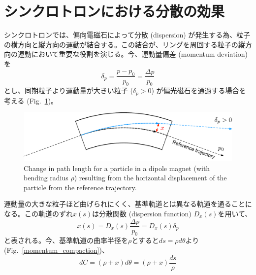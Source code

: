 \documentclass[10pt,a4paper]{ltjsarticle}
\begin{document}
\section{シンクロトロンにおける分散の効果}
シンクロトロンでは、偏向電磁石によって分散 (dispersion) が発生する為、粒子の横方向と縦方向の運動が結合する。この結合が、リングを周回する粒子の縦方向の運動において重要な役割を演じる。今、運動量偏差 (momentum deviation) を
%
\begin{equation}
  \delta_p = \frac{p-p_0}{p_0}=\frac{\Delta p}{p_0}
\end{equation}
%
とし、同期粒子より運動量が大きい粒子 ($\delta_p >0$) が偏光磁石を通過する場合を考える (Fig.~\ref{dispersion})。
%
\begin{figure}[hbt]
  \begin{center}
    \includegraphics[width=15cm,clip]{dispersion.pdf}
    \caption{Change in path length for a particle in a dipole magnet (with bending radius $\rho$) resulting from the horizontal
    displacement of the particle from the reference trajectory.}
    \label{dispersion}
  \end{center}
\end{figure}
%
運動量の大きな粒子ほど曲げられにくく、基準軌道とは異なる軌道を通ることになる。この軌道のずれ$x(s)$は分散関数 (dispersion function) $D_x(s)$を用いて、
%
\begin{equation}
  x(s) = D_x(s)\frac{\Delta p}{p_0} = D_x(s)\delta_p 
\end{equation}
%
と表される。今、基準軌道の曲率半径を$\rho$とすると$ds = \rho d\theta$より (Fig.~\ref{momentum_compaction})、
%
\begin{equation}
  dC = (\rho + x) d\theta = (\rho + x) \frac{ds}{\rho}
\end{equation}
%
\end{document}
